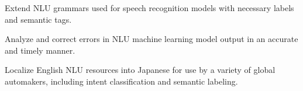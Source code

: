 \documentclass[letterpaper]{deedy-resume_sm} %
\begin{document}
\begin{tightitemize}
\item Extend NLU grammars used for speech recognition models with necessary labels and semantic tags.
\item Analyze and correct errors in NLU machine learning model output in an accurate and timely manner.
\item Localize English NLU resources into Japanese for use by a variety of global automakers, including intent classification and semantic labeling.   
\end{tightitemize}
\end{document}
